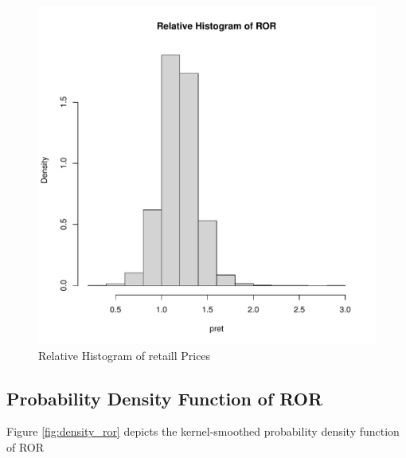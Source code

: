 \documentclass[11pt]{paper}
\begin{document}
\begin{figure}[h!]
  \centering
  \includegraphics[scale = 0.5, keepaspectratio=true]{../Figures/hist_ror}
  \caption{Relative Histogram of retaill Prices} \label{fig:hist_ror}
\end{figure}

\pagebreak
\subsection{Probability Density Function of ROR}

Figure \ref{fig:density_ror} depicts 
the kernel-smoothed probability density function of ROR
\end{document}
